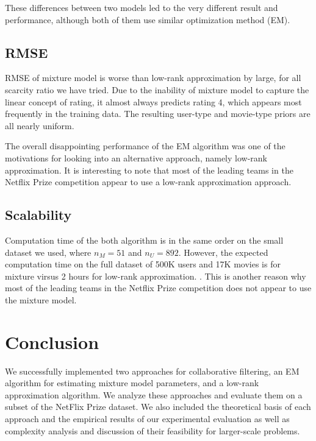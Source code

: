 \documentclass{article}
\begin{document}
These differences between two models led to the very different result and performance, although both of them use similar optimization method (EM).


\subsection{RMSE}
RMSE of mixture model is worse than low-rank approximation by large, for all scarcity ratio we have tried. Due to the inability of mixture model to capture the linear concept of rating, it almost always predicts rating 4, which appears most frequently in the training data. The resulting user-type and movie-type priors are all nearly uniform.

The overall disappointing performance of the EM algorithm was one of the motivations for looking into an alternative approach, namely low-rank approximation. It is interesting to note that most of the leading teams in the Netflix Prize competition appear to use a low-rank approximation
approach.




\subsection{Scalability}

Computation time of the both algorithm is in the same order on the small dataset we used, where $n_M = 51$ and $n_U = 892$. However, the expected computation time on the full dataset of 500K users and 17K movies is  for mixture virsus 2 hours for low-rank approximation. . This is another reason why most of the leading teams in the Netflix Prize competition does not appear to use the mixture model.



\section{Conclusion}


We successfully implemented two approaches for collaborative
filtering, an EM algorithm for estimating mixture model parameters,
and a low-rank approximation algorithm.  We analyze these approaches
and evaluate them on a subset of the NetFlix Prize dataset. We also
included the theoretical basis of each approach and the empirical
results of our experimental evaluation as well as complexity analysis
and discussion of their feasibility for larger-scale problems.
\end{document}

